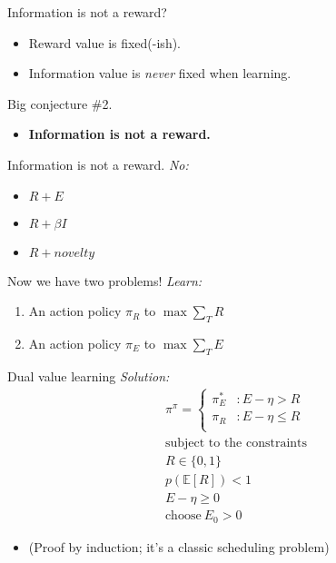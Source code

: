 \documentclass[10pt]{beamer}
\begin{document}
\begin{frame}[fragile]{Information is not a reward?}
\begin{itemize}
    \item Reward value is fixed(-ish).
    \item Information value is \textit{never} fixed when learning.
\end{itemize}
\end{frame}

\begin{frame}[fragile]{Big conjecture \#2.}
\begin{itemize}
    \item \textbf{Information is not a reward.}
\end{itemize}
\end{frame}

\begin{frame}[fragile]{Information is not a reward.}
\textit{No:}
\begin{itemize}
    \item $R + E$
    \item $R + \beta I$
    \item $R + novelty$
\end{itemize}
\end{frame}

\begin{frame}[fragile]{Now we have two problems!}
\textit{Learn:}
\begin{enumerate}
    \item An action policy $\pi_R$ to $\max \sum_T R$
    \item An action policy $\pi_E$ to $\max \sum_T E$
\end{enumerate}
\end{frame}

\begin{frame}[fragile]{Dual value learning}
\textit{Solution:}
\begin{equation*}
    \label{eq:pipi} 
	\begin{split}
		\pi^{\pi} = 
		\begin{cases}
			\pi^*_E & : E - \eta > R \\
			\pi_R & : E - \eta \le R \\
		\end{cases}
		\\
		\text{subject to the constraints}\\
		R \in \{0, 1\} \\
		p(\mathbb E[R]) < 1 \\
		E - \eta \geq 0 \\
		\text{choose}\ E_0 > 0
	\end{split}
\end{equation*}
\begin{itemize}
\item (Proof by induction; it's a classic scheduling problem)
\end{itemize}
\end{frame}
\end{document}
